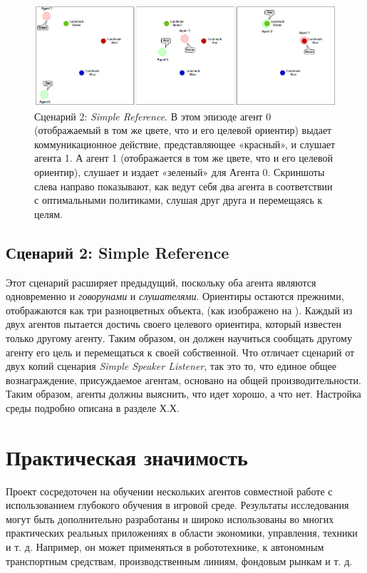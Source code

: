 \begin{figure}[ht!] 
	\center
	\includegraphics [scale=0.80] {my_folder/images/fig0-2-simple-reference.png}
	\caption{Сценарий 2: \textit{Simple Reference}. В этом эпизоде агент 0 (отображаемый в том же цвете, что и его целевой ориентир) выдает коммуникационное действие, представляющее «красный», и слушает агента 1. А агент 1 (отображается в том же цвете, что и его целевой ориентир), слушает и издает «зеленый» для Агента 0. Скриншоты слева направо показывают, как ведут себя два агента в соответствии с оптимальными политиками, слушая друг друга и перемещаясь к целям.} 
	\label{fig:0-1-simple-reference}  
\end{figure}

\subsection{Сценарий 2: Simple Reference}

Этот сценарий расширяет предыдущий, поскольку оба агента являются одновременно и \textit{говорунами} и \textit{слушателями}. Ориентиры остаются прежними, отображаются как три разноцветных объекта, (как изображено на ). Каждый из двух агентов пытается достичь своего целевого ориентира, который известен только другому агенту. Таким образом, он должен научиться сообщать другому агенту его цель и перемещаться к своей собственной. Что отличает сценарий от двух копий сценария \textit{Simple Speaker Listener}, так это то, что единое общее вознаграждение, присуждаемое агентам, основано на общей производительности. Таким образом, агенты должны выяснить, что идет хорошо, а что нет. Настройка среды подробно описана в разделе Х.Х.

\section{Практическая значимость} \label{intro:sec3}

Проект сосредоточен на обучении нескольких агентов совместной работе с использованием глубокого обучения в игровой среде. Результаты исследования могут быть дополнительно разработаны и широко использованы во многих практических реальных приложениях в области экономики, управления, техники и т. д. Например, он может применяться в робототехнике, к автономным транспортным средствам, производственным линиям, фондовым рынкам и т. д.

